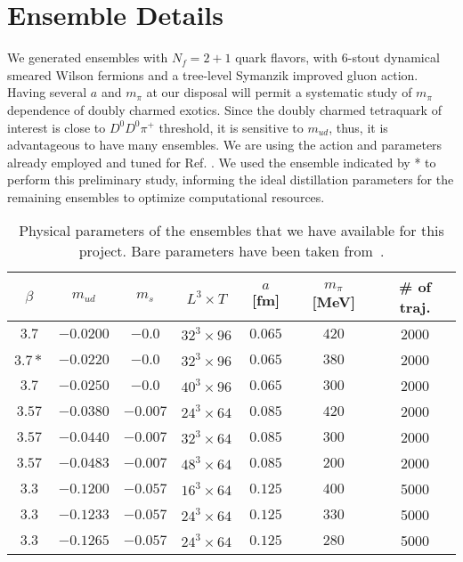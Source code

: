 \section{Ensemble Details}
We generated ensembles with $N_f = 2+1$ quark flavors, with 6-stout dynamical smeared Wilson fermions and a tree-level Symanzik improved gluon action. Having several $a$ and $m_{\pi}$ at our disposal will permit a systematic study of $m_{\pi}$ dependence of doubly charmed exotics. Since the doubly charmed tetraquark of interest is close to $D^0D^0\pi^+$ threshold, it is sensitive to $m_{ud}$, thus, it is advantageous to have many ensembles. 
We are using the action and parameters already employed and tuned for Ref. \cite{Durr:2008zz}. We used the ensemble indicated by * to perform this preliminary study, informing the ideal distillation parameters for the remaining ensembles to optimize computational resources.

\begin{table}[!h]
  \centering \footnotesize
  \begin{tabular}{|c|c|c|c|c|c|c|}
  \hline
  $\beta$  & $m_{ud}$   & $m_{s}$   & $L^3 \times T$  & $a$ [fm]   & $m_\pi$ [MeV]   & \# of traj. \\ \hline \hline
  $3.7$    & $-0.0200$  & $-0.0$    & $32^3\times96$  & $0.065$      & $420$         &  2000      \\ 
  $3.7*$    & $-0.0220$  & $-0.0$    & $32^3\times96$  & $0.065$      & $380$         &  2000      \\ 
  $3.7$    & $-0.0250$  & $-0.0$    & $40^3\times96$  & $0.065$      & $300$         &  2000      \\ \hline
  $3.57$   & $-0.0380$  & $-0.007$  & $24^3\times64$  & $0.085$      & $420$         &  2000      \\ 
  $3.57$   & $-0.0440$  & $-0.007$  & $32^3\times64$  & $0.085$      & $300$         &  2000      \\ 
  $3.57$   & $-0.0483$  & $-0.007$  & $48^3\times64$  & $0.085$      & $200$         &  2000      \\ \hline
  $3.3$    & $-0.1200$  & $-0.057$  & $16^3\times64$  & $0.125$      & $400$         &  5000      \\ 
  $3.3$    & $-0.1233$  & $-0.057$  & $24^3\times64$  & $0.125$      & $330$         &  5000      \\ 
  $3.3$    & $-0.1265$  & $-0.057$  & $24^3\times64$  & $0.125$      & $280$         &  5000      \\ \hline
  \end{tabular}
  \caption{Physical parameters of the ensembles that we have available for this project. Bare parameters have been taken from~\cite{Durr:2008zz}.}
  \end{table}


